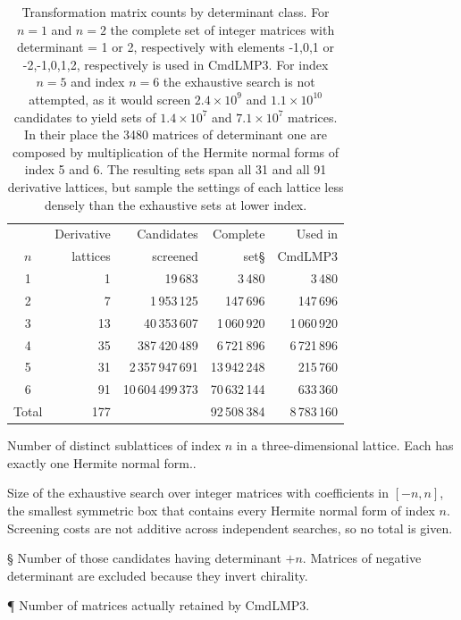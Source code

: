 \documentclass[preprint]{iucr}              %
\numberwithin{equation}{section}
\begin{document}
\begin{table}
		\label{tab:matrix_determinants}
	\caption{Transformation matrix counts by determinant class. For $n=1$ and $n=2$
		the complete set of integer matrices with determinant = 1 or 2, respectively with elements -1,0,1 or -2,-1,0,1,2, respectively is used in CmdLMP3. For index $n=5$ and index $n=6$ the exhaustive search is not attempted, as it would
		screen $2.4\times10^{9}$ and $1.1\times10^{10}$ candidates to yield sets of
		$1.4\times10^{7}$ and $7.1\times10^{7}$ matrices. In their place the 3480
		matrices of determinant one are composed by multiplication of the Hermite normal forms of index
		5 and 6. The resulting sets span all 31 and all 91 derivative lattices, but
		sample the settings of each lattice less densely than the exhaustive sets at lower index.}
		
	\label{tab:matrixcounts}
	
	\vspace{2mm}
	
	\begin{tabular}{crrrr}
		\hline
		& Derivative       & Candidates          & Complete       & Used in \\
		$n$   & lattices\dag     & screened\ddag      & set\S          & CmdLMP3\\
		\hline
		1     &  1 &         19\,683 &        3\,480 &       3\,480 \\
		2     &  7 &   1\,953\,125 &    147\,696 &     147\,696 \\
		3     & 13 &  40\,353\,607 & 1\,060\,920 &  1\,060\,920 \\
		4     & 35 & 387\,420\,489 & 6\,721\,896 &  6\,721\,896 \\
		5     & 31 & 2\,357\,947\,691 & 13\,942\,248 &  215\,760 \\
		6     & 91 & 10\,604\,499\,373 & 70\,632\,144 &  633\,360 \\
		\hline
		Total & 177 & & 92\,508\,384 & 8\,783\,160 \\
		\hline
	\end{tabular}
	
	\vspace{2mm}
	
	\noindent
	{\dag} Number of distinct sublattices of index $n$ in a three-dimensional
	lattice. Each has exactly one Hermite normal form..
	
	\noindent
	{\ddag} Size of the exhaustive search over integer matrices with coefficients in
	$[-n,n]$, the smallest symmetric box that contains every Hermite normal form of
	index $n$. Screening costs are not additive across independent searches, so no
	total is given.
	
	\noindent
	{\S} Number of those candidates having determinant $+n$. Matrices of negative
	determinant are excluded because they invert chirality.
	
	\noindent
	{\P} Number of matrices actually retained by CmdLMP3.
	
\end{table}
\end{document}
